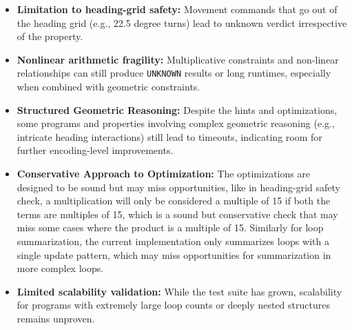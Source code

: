 \begin{itemize}[leftmargin=1.5em]
    \item \textbf{Limitation to heading-grid safety:} Movement commands that go out of the heading grid (e.g., 22.5 degree turns) lead to unknown verdict irrespective of the property.
    \item \textbf{Nonlinear arithmetic fragility:} Multiplicative constraints and non-linear relationships can still produce \texttt{UNKNOWN} results or long runtimes, especially when combined with geometric constraints.
    \item \textbf{Structured Geometric Reasoning:} Despite the hints and optimizations, some programs and properties involving complex geometric reasoning (e.g., intricate heading interactions) still lead to timeouts, indicating room for further encoding-level improvements.
    \item \textbf{Conservative Approach to Optimization:} The optimizations are designed to be sound but may miss opportunities, like in heading-grid safety check, a multiplication will only be considered a multiple of 15 if both the terms are multiples of 15, which is a sound but conservative check that may miss some cases where the product is a multiple of 15. Similarly for loop summarization, the current implementation only summarizes loops with a single update pattern, which may miss opportunities for summarization in more complex loops. 
    \item \textbf{Limited scalability validation:} While the test suite has grown, scalability for programs with extremely large loop counts or deeply nested structures remains unproven.
\end{itemize}

